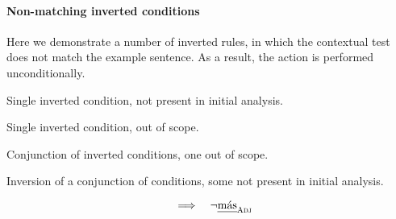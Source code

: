 \paragraph{Non-matching inverted conditions}

Here we demonstrate a number of inverted rules, in which the contextual test does not match the example sentence. As a result, the action is performed unconditionally.

 Single inverted condition, not present in initial analysis.

 Single inverted condition, out of scope.

 Conjunction of inverted conditions, one out of scope.

 Inversion of a conjunction of conditions, some not present in initial analysis.

\begin{equation}
 \quad\Longrightarrow\quad \neg{}\text{\em m\'{a}s}_{\text{\sc Adj}}
\end{equation}






